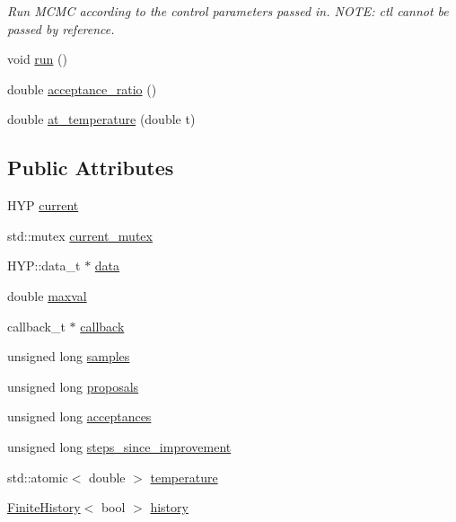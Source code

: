 \begin{DoxyCompactItemize}
\begin{DoxyCompactList}\small\item\em Run M\+C\+MC according to the control parameters passed in. N\+O\+TE\+: ctl cannot be passed by reference. \end{DoxyCompactList}\item 
void \hyperlink{class_m_c_m_c_chain_ae59e07a79da1bf56b01429efcb9fb312}{run} ()
\item 
double \hyperlink{class_m_c_m_c_chain_a4b2b8b51e5ba868bca024f2be737e4c6}{acceptance\+\_\+ratio} ()
\item 
double \hyperlink{class_m_c_m_c_chain_a9adc3d08662ad7035cc9d9d75a1fc5a6}{at\+\_\+temperature} (double t)
\end{DoxyCompactItemize}
\subsection*{Public Attributes}
\begin{DoxyCompactItemize}
\item 
H\+YP \hyperlink{class_m_c_m_c_chain_ab0c3b31e96d1f703bb8cf55c0575b4bd}{current}
\item 
std\+::mutex \hyperlink{class_m_c_m_c_chain_a42c355121fce0476426a49d5498c38a1}{current\+\_\+mutex}
\item 
H\+Y\+P\+::data\+\_\+t $\ast$ \hyperlink{class_m_c_m_c_chain_ab235f08fad93a9626ffb566c001ed5c9}{data}
\item 
double \hyperlink{class_m_c_m_c_chain_a3b8d31f47d75503321b432eeac0bb13b}{maxval}
\item 
callback\+\_\+t $\ast$ \hyperlink{class_m_c_m_c_chain_aa7a4a0d46ae2d9818c2f076f839badd7}{callback}
\item 
unsigned long \hyperlink{class_m_c_m_c_chain_a0d3ac649b04077cd0ffea236df560c91}{samples}
\item 
unsigned long \hyperlink{class_m_c_m_c_chain_aec2cdd6a3e25447c7f34e31d0d98dbcb}{proposals}
\item 
unsigned long \hyperlink{class_m_c_m_c_chain_ae1597e42074b2efb93ace3e40f1f7a45}{acceptances}
\item 
unsigned long \hyperlink{class_m_c_m_c_chain_aeac1cd63d13c397ba01cca35b605b786}{steps\+\_\+since\+\_\+improvement}
\item 
std\+::atomic$<$ double $>$ \hyperlink{class_m_c_m_c_chain_a7173287e1c0e681a9912a84c87320ece}{temperature}
\item 
\hyperlink{class_finite_history}{Finite\+History}$<$ bool $>$ \hyperlink{class_m_c_m_c_chain_a83cb52eb26bdb914c0eb483f541972a9}{history}
\end{DoxyCompactItemize}


